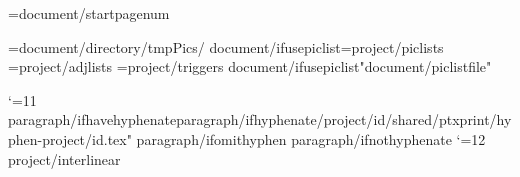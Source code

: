 \def\RHnoVoddleft{{{header/noVoddleft}}}
\def\RHnoVoddcenter{{{header/noVoddcenter}}}
\def\RHnoVoddright{{{header/noVoddright}}}


\def\RFoddcenter{{{footer/oddcenter}}}
\def\RFevencenter{{{footer/oddcenter}}}
\def\RFtitleevencenter{{{footer/titleevencenter}}}
\def\RFtitleoddcenter{{{footer/titleoddcenter}}}
\def\RFnoVoddcenter{{{footer/oddcenter}}}
\def\RFnoVevencenter{{{footer/oddcenter}}}
  
\pageno={document/startpagenum}

\PicPath={{{document/directory}/tmpPics/}}
{document/ifusepiclist}\PicListPath={{{project/piclists}}}
\AdjListPath={{{project/adjlists}}}
\TrigListPath={{{project/triggers}}}
{document/ifusepiclist}\openpiclist "{document/piclistfile}"

\catcode`\@=11
\def\b{{\the\p@rstylehooks \par\bgroup\s@tbaseline{{b}}\vskip\baselineskip\egroup}}
\newlanguage\langund \language\langund
{paragraph/ifhavehyphenate}{paragraph/ifhyphenate}\bgroup{}/{project/id}/shared/ptxprint/hyphen-{project/id}.tex" \egroup
{paragraph/ifomithyphen}
{paragraph/ifnothyphenate} 
\catcode`\@=12
\let\pb=\pagebreak
{project/interlinear}\expandafter\def\csname complex-rb\endcsname{{}}




